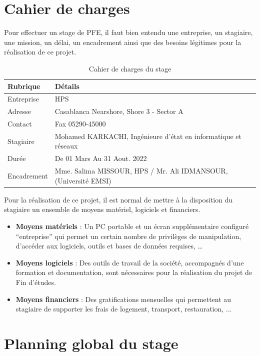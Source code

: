 \section{Cahier de charges}

Pour effectuer un stage de PFE, il faut bien entendu une entreprise, un stagiaire, une mission, un délai, un encadrement ainsi que des besoins légitimes pour la réalisation de ce projet.

\begin{table}[H]
\centering
\caption{Cahier de charges du stage}
\begin{tabularx}{0.9\textwidth}{l X}
\toprule
\textbf{Rubrique} & \textbf{Détails} \\
\midrule
Entreprise & HPS \\
Adresse & Casablanca Nearshore, Shore 3 - Sector A \\
Contact & Fax 05290-45000 \\
Stagiaire & Mohamed KARKACHI, Ingénieure d'état en informatique et réseaux \\
Durée & De 01 Mars Au 31 Aout. 2022 \\
Encadrement & Mme. Salima MISSOUR, HPS / Mr. Ali IDMANSOUR, (Université EMSI) \\
\bottomrule
\end{tabularx}
\end{table}

Pour la réalisation de ce projet, il est normal de mettre à la disposition du stagiaire un ensemble de moyens matériel, logiciels et financiers.

\begin{itemize}[leftmargin=*]
\item[$\checkmark$] \textbf{Moyens matériels} : Un PC portable et un écran supplémentaire configuré ``entreprise'' qui permet un certain nombre de privilèges de manipulation, d'accéder aux logiciels, outils et bases de données requises, \ldots
\item[$\checkmark$] \textbf{Moyens logiciels} : Des outils de travail de la société, accompagnés d'une formation et documentation, sont nécessaires pour la réalisation du projet de Fin d'études.
\item[$\checkmark$] \textbf{Moyens financiers} : Des gratifications mensuelles qui permettent au stagiaire de supporter les frais de logement, transport, restauration, ...
\end{itemize}

\section{Planning global du stage}

